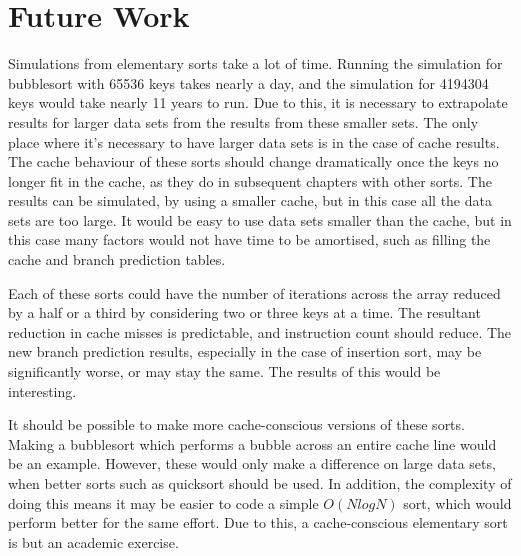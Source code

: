 \section{Future Work}
Simulations from elementary sorts take a lot of time. Running the simulation for
bubblesort with 65536 keys takes nearly a day, and the simulation for 4194304
keys would take nearly 11 years to run. Due to this, it is necessary to
extrapolate results for larger data sets from the results from these smaller
sets. The only place where it's necessary to have larger data sets is in the
case of cache results. The cache behaviour of these sorts should change
dramatically once the keys no longer fit in the cache, as they do in subsequent
chapters with other sorts. The results can be simulated, by using a
smaller cache, but in this case all the data sets are too large. It would be
easy to use data sets smaller than the cache, but in this case many factors
would not have time to be amortised, such as filling the cache and branch
prediction tables.

Each of these sorts could have the number of iterations across the array reduced
by a half or a third by considering two or three keys at a time. The resultant
reduction in cache misses is predictable, and instruction count should reduce.
The new branch prediction results, especially in the case of insertion sort, may
be significantly worse, or may stay the same. The results of this would be
interesting.

It should be possible to make more cache-conscious versions of these sorts.
Making a bubblesort which performs a bubble across an entire cache line would
be an example. However, these would only make a difference on large data sets,
when better sorts such as quicksort should be used. In addition, the complexity
of doing this means it may be easier to code a simple $O(NlogN)$ sort, which
would perform better for the same effort. Due to this, a cache-conscious
elementary sort is but an academic exercise.
